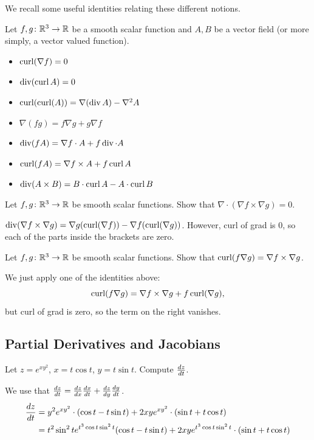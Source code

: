 We recall some useful identities relating these different notions.

\begin{theorem}
Let $f,g \colon \mathbb{R}^3 \rightarrow \mathbb{R}$ be a smooth scalar function 
and $A,B$ be a vector field (or more simply, a vector valued function).
    \begin{itemize}
        \item $\operatorname{curl} (\nabla f) = 0$
        \item $\operatorname{div} (\operatorname{curl} A) = 0$
        \item $\operatorname{curl} (\operatorname{curl} (A)) = \nabla (\operatorname{div} A) - \nabla ^2 A$
        \item $\nabla(fg) = f \nabla g + g \nabla f$
        \item $\operatorname{div} (fA) = \nabla f \cdot A + f \operatorname{div} \cdot A$
        \item $\operatorname{curl} (fA) = \nabla f \times A + f \operatorname{curl} A$
        \item $\operatorname{div} ( A \times B) = B \cdot \operatorname{curl} A - A \cdot \operatorname{curl} B$
    \end{itemize}
\end{theorem}

\begin{exercise}
Let $f,g \colon \mathbb{R}^3 \rightarrow \mathbb{R}$ be smooth scalar functions. 
Show that $\nabla \cdot (\nabla f \times \nabla g) = 0$.
\end{exercise}
\begin{solution}
$\operatorname{div}(\nabla f \times \nabla g) = \nabla g (\operatorname{curl}(\nabla f)) - \nabla f(\operatorname{curl}(\nabla g))$.
However, curl of grad is $0$, so each of the parts inside the brackets are zero.
\end{solution}

\begin{exercise}
Let $f,g \colon \mathbb{R}^3 \rightarrow \mathbb{R}$ be smooth scalar functions.   
Show that $\operatorname{curl} (f \nabla g) = \nabla f \times \nabla g$.
\end{exercise}
\begin{solution}
We just apply one of the identities above:
\[
\operatorname{curl} (f \nabla g) = \nabla f \times \nabla g + f \operatorname{curl} (\nabla g),
\]
but curl of grad is zero, so the term on the right vanishes.
\end{solution}

\subsection{Partial Derivatives and Jacobians}

\begin{exercise}
Let $z = e^{xy^2}$, $x = t \cos t$, $y = t \sin t$. Compute $\frac{d z}{d t}$.
\end{exercise}
\begin{solution}
We use that $\frac{d z}{d t} = \frac{d z}{d x} \frac{d x}{d t} + \frac{d z}{d y} \frac{d y}{d t}$.
\begin{align*}
\frac{d z}{d t} &= y^2e^{xy^2}\cdot (\cos t -t\sin t) + 2xye^{xy^2} \cdot (\sin t + t \cos t) \\
&=t^2 \sin^2 t e^{t^3 \cos t \sin^2t}(\cos t -t\sin t) + 2xye^{t^3 \cos t \sin^2t} \cdot (\sin t + t \cos t)
\end{align*}
\end{solution}

